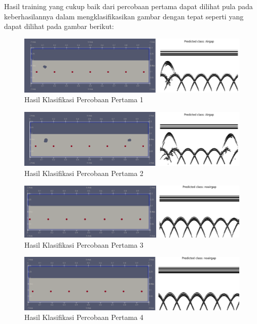 Hasil training yang cukup baik dari percobaan pertama dapat dilihat pula pada keberhasilannya dalam mengklasifikasikan gambar dengan tepat seperti yang dapat dilihat pada gambar berikut:

\begin{figure} [H] \centering
    \includegraphics[scale=0.2]{gambar/bab4/Airgap 1999.png}
    \caption{Hasil Klasifikasi Percobaan Pertama 1}
\end{figure}

\begin{figure} [H] \centering
    \includegraphics[scale=0.2]{gambar/bab4/Airgap 2000.png}
    \caption{Hasil Klasifikasi Percobaan Pertama 2}
\end{figure}

\begin{figure} [H] \centering
    \includegraphics[scale=0.2]{gambar/bab4/Noarigap 1900.png}
    \caption{Hasil Klasifikasi Percobaan Pertama 3}
\end{figure}

\begin{figure} [H] \centering
    \includegraphics[scale=0.2]{gambar/bab4/Noairgap 2000.png}
    \caption{Hasil Klasifikasi Percobaan Pertama 4}
\end{figure}

